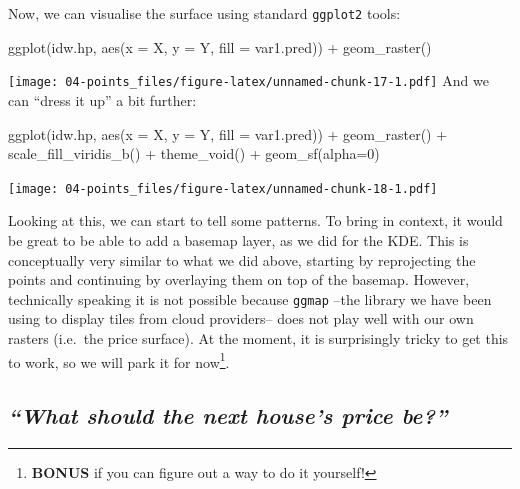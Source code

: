 \documentclass[
]{book}
\newenvironment{Shaded}{\begin{snugshade}}{\end{snugshade}}
\newcommand{\AttributeTok}[1]{\textcolor[rgb]{0.77,0.63,0.00}{#1}}
\newcommand{\DecValTok}[1]{\textcolor[rgb]{0.00,0.00,0.81}{#1}}
\newcommand{\FunctionTok}[1]{\textcolor[rgb]{0.00,0.00,0.00}{#1}}
\newcommand{\NormalTok}[1]{#1}
\newcommand{\SpecialCharTok}[1]{\textcolor[rgb]{0.00,0.00,0.00}{#1}}
\begin{document}
Now, we can visualise the surface using standard \texttt{ggplot2} tools:

\begin{Shaded}
\begin{Highlighting}[]
\FunctionTok{ggplot}\NormalTok{(idw.hp, }\FunctionTok{aes}\NormalTok{(}\AttributeTok{x =}\NormalTok{ X, }\AttributeTok{y =}\NormalTok{ Y, }\AttributeTok{fill =}\NormalTok{ var1.pred)) }\SpecialCharTok{+}
  \FunctionTok{geom\_raster}\NormalTok{()}
\end{Highlighting}
\end{Shaded}

\texttt{[image: 04-points\_files/figure-latex/unnamed-chunk-17-1.pdf]}
And we can ``dress it up'' a bit further:

\begin{Shaded}
\begin{Highlighting}[]
\FunctionTok{ggplot}\NormalTok{(idw.hp, }\FunctionTok{aes}\NormalTok{(}\AttributeTok{x =}\NormalTok{ X, }\AttributeTok{y =}\NormalTok{ Y, }\AttributeTok{fill =}\NormalTok{ var1.pred)) }\SpecialCharTok{+}
  \FunctionTok{geom\_raster}\NormalTok{() }\SpecialCharTok{+}
  \FunctionTok{scale\_fill\_viridis\_b}\NormalTok{() }\SpecialCharTok{+}
  \FunctionTok{theme\_void}\NormalTok{() }\SpecialCharTok{+}
  \FunctionTok{geom\_sf}\NormalTok{(}\AttributeTok{alpha=}\DecValTok{0}\NormalTok{)}
\end{Highlighting}
\end{Shaded}

\texttt{[image: 04-points\_files/figure-latex/unnamed-chunk-18-1.pdf]}

Looking at this, we can start to tell some patterns. To bring in context, it would be great to be able to add a basemap layer, as we did for the KDE. This is conceptually very similar to what we did above, starting by reprojecting the points and continuing by overlaying them on top of the basemap. However, technically speaking it is not possible because \texttt{ggmap} --the library we have been using to display tiles from cloud providers-- does not play well with our own rasters (i.e.~the price surface). At the moment, it is surprisingly tricky to get this to work, so we will park it for now\footnote{\textbf{BONUS} if you can figure out a way to do it yourself!}.

\hypertarget{what-should-the-next-houses-price-be}{%
\subsection{\texorpdfstring{\emph{``What should the next house's price be?''}}{``What should the next house's price be?''}}\label{what-should-the-next-houses-price-be}}
\end{document}
